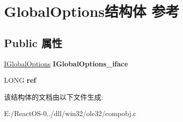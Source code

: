 \hypertarget{struct_global_options}{}\section{Global\+Options结构体 参考}
\label{struct_global_options}
\subsection*{Public 属性}
\begin{DoxyCompactItemize}
\item 
\mbox{\label{struct_global_options_a1b1e4cc803d807634af2639a97218a0b}} 
\hyperlink{interface_i_global_options}{I\+Global\+Options} {\bfseries I\+Global\+Options\+\_\+iface}
\item 
\mbox{\label{struct_global_options_a32dadf066e2c37d2a5efe1932725156a}} 
L\+O\+NG {\bfseries ref}
\end{DoxyCompactItemize}


该结构体的文档由以下文件生成\+:\begin{DoxyCompactItemize}
\item 
E\+:/\+React\+O\+S-\/0../dll/win32/ole32/compobj.\+c\end{DoxyCompactItemize}
